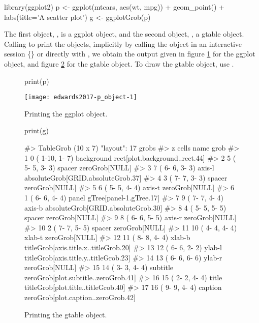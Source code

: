 \begin{Sinput}
library(ggplot2)
p <- ggplot(mtcars, aes(wt, mpg)) + geom_point() + labs(title='A scatter plot')
g <- ggplotGrob(p)
\end{Sinput}


The first object, , is a ggplot object, and the second object,
, a gtable object. Calling to print the objects, implicitly by
calling the object in an interactive session \{\R\} or directly with
, we obtain the output given in figure \ref{fig:p_object}
for the ggplot object, and figure \ref{fig:g_object} for the gtable
object. To draw the gtable object, use .

\begin{figure}[h!]

\begin{Sinput}
print(p)
\end{Sinput}

\texttt{[image: edwards2017-p\_object-1]} 
\caption{Printing the ggplot object.}
\label{fig:p_object}
\end{figure}

\begin{figure}[h!]

\begin{Sinput}
print(g)
\end{Sinput}
\begin{Soutput}
#> TableGrob (10 x 7) "layout": 17 grobs
#>     z         cells       name                                  grob
#> 1   0 ( 1-10, 1- 7) background        rect[plot.background..rect.44]
#> 2   5 ( 5- 5, 3- 3)     spacer                        zeroGrob[NULL]
#> 3   7 ( 6- 6, 3- 3)     axis-l    absoluteGrob[GRID.absoluteGrob.37]
#> 4   3 ( 7- 7, 3- 3)     spacer                        zeroGrob[NULL]
#> 5   6 ( 5- 5, 4- 4)     axis-t                        zeroGrob[NULL]
#> 6   1 ( 6- 6, 4- 4)      panel               gTree[panel-1.gTree.17]
#> 7   9 ( 7- 7, 4- 4)     axis-b    absoluteGrob[GRID.absoluteGrob.30]
#> 8   4 ( 5- 5, 5- 5)     spacer                        zeroGrob[NULL]
#> 9   8 ( 6- 6, 5- 5)     axis-r                        zeroGrob[NULL]
#> 10  2 ( 7- 7, 5- 5)     spacer                        zeroGrob[NULL]
#> 11 10 ( 4- 4, 4- 4)     xlab-t                        zeroGrob[NULL]
#> 12 11 ( 8- 8, 4- 4)     xlab-b titleGrob[axis.title.x..titleGrob.20]
#> 13 12 ( 6- 6, 2- 2)     ylab-l titleGrob[axis.title.y..titleGrob.23]
#> 14 13 ( 6- 6, 6- 6)     ylab-r                        zeroGrob[NULL]
#> 15 14 ( 3- 3, 4- 4)   subtitle  zeroGrob[plot.subtitle..zeroGrob.41]
#> 16 15 ( 2- 2, 4- 4)      title   titleGrob[plot.title..titleGrob.40]
#> 17 16 ( 9- 9, 4- 4)    caption   zeroGrob[plot.caption..zeroGrob.42]
\end{Soutput}

  \caption{Printing the gtable object.}
  \label{fig:g_object}
\end{figure}


